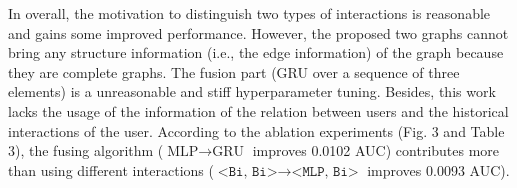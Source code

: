 In overall, the motivation to distinguish two types of interactions is reasonable and gains some improved performance.
However, the proposed two graphs cannot bring any structure information (i.e., the edge information) of the graph because they are complete graphs.
The fusion part (GRU over a sequence of three elements) is a unreasonable and stiff hyperparameter tuning.
Besides, this work lacks the usage of the information of the relation between users and the historical interactions of the user.
According to the ablation experiments (Fig. 3 and Table 3), the fusing algorithm ($\text{MLP} \rightarrow \text{GRU}$ improves 0.0102 AUC) contributes more than using different interactions ($\texttt{<Bi, Bi>} \rightarrow \texttt{<MLP, Bi>}$ improves 0.0093 AUC).